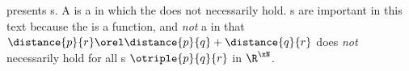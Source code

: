 \begin{minipage}{\tw-50mm}\imarks
   presents s.
  A  is a  in which the  does not
  necessarily hold.
  s are important in this text because the  is a  function,
  and \emph{not} a  in that %
  $\distance{p}{r}\orel\distance{p}{q}+\distance{q}{r}$
  does \emph{not} necessarily hold for all s $\otriple{p}{q}{r}$ in $\R^\xN$.
\end{minipage}\hfill{}






